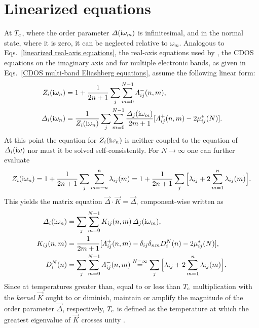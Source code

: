 \section{Linearized equations}

At $T \sb{\text{c}}$, where the order parameter $\varDelta(\mathrm i \omega_m)$ is infinitesimal,
and in the normal state, where it is zero, it can be neglected relative to
$\omega_m$. Analogous to Eqs.~\ref{linearized real-axis equations}, the
real-axis equations used by , the CDOS 
equations on the imaginary axis and for multiple electronic bands, as given in
Eqs.~\ref{CDOS multi-band Eliashberg equations}, assume the following linear
form:
%
\begin{subequations} \label{linearized CDOS multi-band Eliashberg equations}
    \begin{align}
        Z_i(\mathrm i \omega_n)
        &= 1 + \frac 1 {2 n + 1} \sum_j \sum_{m = 0}^{N - 1}
        \varLambda_{i j}^-(n, m),
        \\
        \varDelta_i(\mathrm i \omega_n) &= \frac 1 {Z_i(\mathrm i \omega_n)}
        \sum_j \sum_{m = 0}^{N - 1}
        \frac{\varDelta_j(\mathrm i \omega_m)}{2 m + 1}
        [\varLambda_{i j}^+(n, m) - 2 \mu^*_{i j}(N)].
    \end{align}
\end{subequations}
%
At this point the equation for $Z_i(\mathrm i \omega_n)$ is neither coupled to the
equation of $\varDelta_i(\mathrm i \omega)$ nor must it be solved self-consistently. For
$N \rightarrow \infty$ one can further evaluate
%
\begin{equation} \label{normal-state renormalization}
    Z_i(\mathrm i \omega_n) = 1 + \frac 1 {2 n + 1} \sum_j \sum_{m = -n}^n
    \lambda_{i j}(m)
    = 1 + \frac 1 {2 n + 1} \sum_j
    \Big[ \lambda_{i j} + 2 \sum_{m = 1}^n \lambda_{i j}(m) \Big].
\end{equation}
%
This yields the matrix equation $\vec \Delta \cdot \vec K = \vec \Delta$,
component-wise written as \cite[Eq.~11.10]{AllenMitrovic82}
%
\begin{equation} \label{CDOS linearized gap equation}
    \begin{split}
        \varDelta_i(\mathrm i \omega_n) &= \sum_j \sum_{m = 0}^{N - 1}
        K_{i j}(n, m) \, \varDelta_j(\mathrm i \omega_m),
        \\
        K_{i j}(n, m) &= \frac 1 {2 m + 1} [\varLambda_{i j}^+(n, m)
        - \delta_{i j} \delta_{n m} D_i^N(n) - 2 \mu^*_{i j}(N)],
        \\
        D_i^N(n) &= \sum_j \sum_{m = 0}^{N - 1} \varLambda_{i j}^-(n, m)
        \overset{N = \infty} =
        \sum_j \Big[ \lambda_{i j} + 2 \sum_{m = 1}^n \lambda_{i j}(m) \Big].
    \end{split}
\end{equation}
%
Since at temperatures greater than, equal to or less than $T \sb{\text{c}}$
multiplication with the \emph{kernel} $\vec K$ ought to or diminish, maintain or
amplify the magnitude of the order parameter $\vec \Delta$, respectively, $T
\sb{\text{c}}$ is defined as the temperature at which the greatest eigenvalue of $\vec
K$ crosses unity \cite[47]{AllenMitrovic82}.

